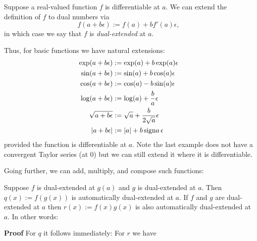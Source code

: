 \begin{definition} Suppose a real-valued function $f$ is differentiable at $a$. We can extend the definition of $f$ to dual numbers via
\[
f(a + b \ensuremath{\epsilon}) := f(a) + b f'(a) \ensuremath{\epsilon},
\]
in which case we say that $f$ is \emph{dual-extended} at $a$.

Thus, for basic functions we have natural extensions:
\begin{align*}
\exp(a + b \ensuremath{\epsilon}) &:= \exp(a) + b \exp(a) \ensuremath{\epsilon} \\
\sin(a + b \ensuremath{\epsilon}) &:= \sin(a) + b \cos(a) \ensuremath{\epsilon} \\
\cos(a + b \ensuremath{\epsilon}) &:= \cos(a) - b \sin(a) \ensuremath{\epsilon} \\
\log(a + b \ensuremath{\epsilon}) &:= \log(a) + {b \over a} \ensuremath{\epsilon} \\
\sqrt{a+b \ensuremath{\epsilon}} &:= \sqrt{a} + {b \over 2 \sqrt{a}} \ensuremath{\epsilon} \\
|a + b \ensuremath{\epsilon}| &:= |a| + b\, {\rm sign} a\, \ensuremath{\epsilon}
\end{align*}
provided the function is differentiable at $a$. Note the last example does not have a convergent Taylor series (at 0) but we can still extend it where it is differentiable.

Going further, we can add, multiply, and compose such functions:

\begin{lemma} Suppose $f$ is dual-extended at $g(a)$ and $g$ is dual-extended at $a$. Then $q(x) := f(g(x))$ is automatically dual-extended at $a$. If $f$ and $g$ are dual-extended at $a$ then  $r(x) := f(x) g(x)$ is also automatically dual-extended at $a$. In other words:
\end{lemma}
\textbf{Proof} For $q$ it follows immediately:
For $r$ we have
\end{definition}


